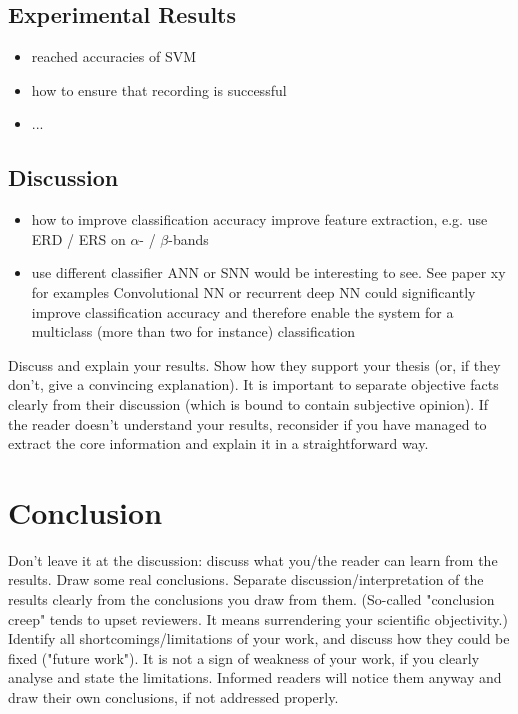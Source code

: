 \documentclass[a4paper,twoside, openright,12pt]{report}
\begin{document}
\section{Experimental Results}

\begin{itemize}
	\item reached accuracies of SVM
	\item how to ensure that recording is successful  
	\item ...
\end{itemize}


\section{Discussion}
\begin{itemize}
	\item how to improve classification accuracy
	\subitem improve feature extraction, e.g. use ERD / ERS on $\alpha$- / $\beta$-bands 
	\item use different classifier 
	\subitem ANN or SNN would be interesting to see. See paper xy for examples
	\subitem Convolutional NN or recurrent deep NN could significantly improve classification accuracy and therefore enable the system for a multiclass (more than two for instance) classification 
\end{itemize}


Discuss and explain your results. Show how they support your thesis (or, if they don't, give a convincing explanation). It is important to separate objective facts clearly from their discussion (which is bound to contain subjective opinion). If the reader doesn't understand your results, reconsider if you have managed to extract the core information and explain it in a straightforward way.




\chapter{Conclusion}

Don't leave it at the discussion: discuss what you/the reader can learn from the results. Draw some real conclusions. Separate discussion/interpretation of the results clearly from the conclusions you draw from them. (So-called "conclusion creep" tends to upset reviewers. It means surrendering your scientific objectivity.) Identify all shortcomings/limitations of your work, and discuss how they could be fixed ("future work"). It is not a sign of weakness of your work, if you clearly analyse and state the limitations. Informed readers will notice them anyway and draw their own conclusions, if not addressed properly.
\end{document}
